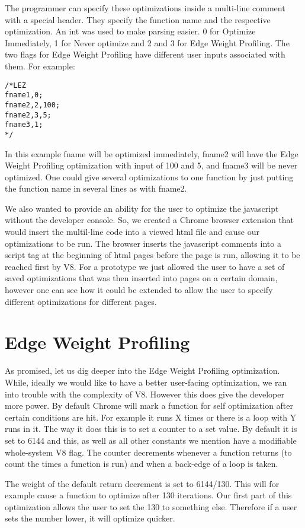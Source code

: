 \documentclass[twocolumn,showpacs,%
  nofootinbib,aps,superscriptaddress,%
  eqsecnum,prd,notitlepage,showkeys,10pt]{revtex4-1}
\begin{document}
The programmer can specify these optimizations inside a multi-line comment with a special header. They specify the function name and the respective optimization. An int was used to make parsing easier. 0 for Optimize Immediately, 1 for Never optimize and 2 and 3 for Edge Weight Profiling. The two flags for Edge Weight Profiling have different user inputs associated with them. For example:
\begin{lstlisting}
/*LEZ
fname1,0;
fname2,2,100;
fname2,3,5;
fname3,1;
*/
\end{lstlisting}
In this example fname will be optimized immediately, fname2 will have the Edge Weight Profiling optimization with input of 100 and 5, and fname3 will be never optimized. One could give several optimizations to one function by just putting the function name in several lines as with fname2.

We also wanted to provide an ability for the user to optimize the javascript without the developer console. So, we created a Chrome browser extension that would insert the multil-line code into a viewed html file and cause our optimizations to be run. The browser inserts the javascript comments into a script tag at the beginning of html pages before the page is run, allowing it to be reached first by V8. For a prototype we just allowed the user to have a set of saved optimizations that was then inserted into pages on a certain domain, however one can see how it could be extended to allow the user to specify different optimizations for different pages.

\section{Edge Weight Profiling}
As promised, let us dig deeper into the Edge Weight Profiling optimization. While, ideally we would like to have a better user-facing optimization, we ran into trouble with the complexity of V8. However this does give the developer more power. By default Chrome will mark a function for self optimization after certain conditions are hit. For example it runs X times or there is a loop with Y runs in it. The way it does this is to set a counter to a set value. By default it is set to 6144 and this, as well as all other constants we mention have a modifiable whole-system V8 flag. The counter decrements whenever a function returns (to count the times a function is run) and when a back-edge of a loop is taken. 

The weight of the default return decrement is set to 6144/130.  This will for example cause a function to optimize after 130 iterations. Our first part of this optimization allows the user to set the 130 to something else. Therefore if a user sets the number lower, it will optimize quicker.
\end{document}
